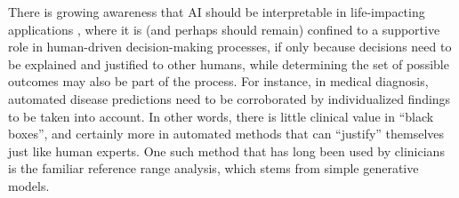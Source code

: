 \documentclass[english]{scrartcl}
\begin{document}
There is growing awareness that AI should be interpretable in life-impacting applications \cite{Molnar-18}, where it is (and perhaps should remain) confined to a supportive role in human-driven decision-making processes, if only because decisions need to be explained and justified to other humans, while determining the set of possible outcomes may also be part of the process. For instance, in medical diagnosis, automated disease predictions need to be corroborated by individualized findings to be taken into account. In other words, there is little clinical value in ``black boxes'', and certainly more in automated methods that can ``justify'' themselves just like human experts. One such method that has long been used by clinicians is the familiar reference range analysis, which stems from simple generative models.




\end{document}
